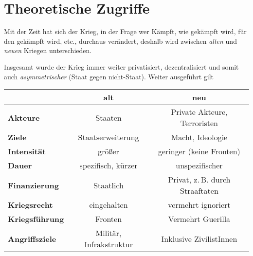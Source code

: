 \documentclass{article}
\begin{document}
\section{Theoretische Zugriffe}
Mit der Zeit hat sich der Krieg, in der Frage wer Kämpft, wie gekämpft wird, für den gekämpft wird, etc., durchaus verändert, deshalb wird zwischen \emph{alten} und \emph{neuen} Kriegen unterschieden.
 
Insgesamt wurde der Krieg immer weiter privatisiert, dezentralisiert und somit auch \emph{asymmetrischer} (Staat gegen nicht-Staat). Weiter ausgeführt gilt 
\begin{center}
\begin{tabular}{ |l|c|c| }
\hline
  & \textbf{alt} & \textbf{neu} \\
\hline
 \textbf{Akteure} & Staaten & Private Akteure, Terroristen \\
\hline
 \textbf{Ziele} & Staatserweiterung & Macht, Ideologie \\
\hline
 \textbf{Intensität} & größer & geringer (keine Fronten) \\
\hline
 \textbf{Dauer} & spezifisch, kürzer & unspezifischer \\
\hline
 \textbf{Finanzierung} & Staatlich & Privat, z.\,B. durch Straaftaten \\
\hline
 \textbf{Kriegsrecht} & eingehalten & vermehrt ignoriert \\
\hline
 \textbf{Kriegsführung} & Fronten & Vermehrt Guerilla \\
\hline
 \textbf{Angriffsziele} & Militär, Infrakstruktur & Inklusive ZivilistInnen \\
\hline
\end{tabular}
\end{center}
 
\end{document}
